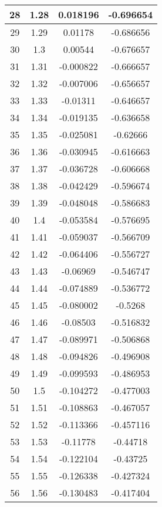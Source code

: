 \begin{table}
\begin{center}
\begin{tabular}{c|c|c|c}
			\hline
			28 & 1.28 & 0.018196 & -0.696654 \\
			\hline
			29 & 1.29 & 0.01178 & -0.686656 \\
			\hline
			30 & 1.3 & 0.00544 & -0.676657 \\
			\hline
			31 & 1.31 & -0.000822 & -0.666657 \\
			\hline
			32 & 1.32 & -0.007006 & -0.656657 \\
			\hline
			33 & 1.33 & -0.01311 & -0.646657 \\
			\hline
			34 & 1.34 & -0.019135 & -0.636658 \\
			\hline
			35 & 1.35 & -0.025081 & -0.62666 \\
			\hline
			36 & 1.36 & -0.030945 & -0.616663 \\
			\hline
			37 & 1.37 & -0.036728 & -0.606668 \\
			\hline
			38 & 1.38 & -0.042429 & -0.596674 \\
			\hline
			39 & 1.39 & -0.048048 & -0.586683 \\
			\hline
			40 & 1.4 & -0.053584 & -0.576695 \\
			\hline
			41 & 1.41 & -0.059037 & -0.566709 \\
			\hline
			42 & 1.42 & -0.064406 & -0.556727 \\
			\hline
			43 & 1.43 & -0.06969 & -0.546747 \\
			\hline
			44 & 1.44 & -0.074889 & -0.536772 \\
			\hline
			45 & 1.45 & -0.080002 & -0.5268 \\
			\hline
			46 & 1.46 & -0.08503 & -0.516832 \\
			\hline
			47 & 1.47 & -0.089971 & -0.506868 \\
			\hline
			48 & 1.48 & -0.094826 & -0.496908 \\
			\hline
			49 & 1.49 & -0.099593 & -0.486953 \\
			\hline
			50 & 1.5 & -0.104272 & -0.477003 \\
			\hline
			51 & 1.51 & -0.108863 & -0.467057 \\
			\hline
			52 & 1.52 & -0.113366 & -0.457116 \\
			\hline
			53 & 1.53 & -0.11778 & -0.44718 \\
			\hline
			54 & 1.54 & -0.122104 & -0.43725 \\
			\hline
			55 & 1.55 & -0.126338 & -0.427324 \\
			\hline
			56 & 1.56 & -0.130483 & -0.417404 \\
			\hline

\end{tabular}
\end{center}
\end{table}

